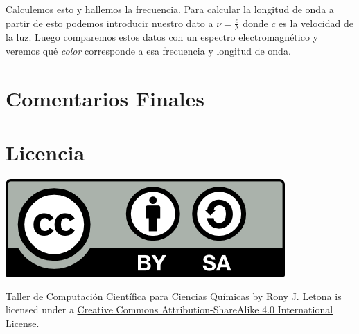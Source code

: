\documentclass[10pt,letterpaper]{article}
\begin{document}
Calculemos esto y hallemos la frecuencia. Para calcular la longitud de onda a partir de esto podemos introducir nuestro dato a $\nu = \frac{c}{\lambda}$ donde $c$ es la velocidad de la luz. Luego comparemos estos datos con un espectro electromagn\'etico y veremos qu\'e \emph{color} corresponde a esa frecuencia y longitud de onda.

\section{Comentarios Finales}


\section*{Licencia}

\noindent \includegraphics{img/cc_big.png}

\noindent Taller de Computaci\'on Cient\'ifica para Ciencias Qu\'imicas by \href{http://github.com/zronyj/TC3Q}{Rony J. Letona} is licensed under a \href{http://creativecommons.org/licenses/by-sa/4.0/}{Creative Commons Attribution-ShareAlike 4.0 International License}.
\end{document}
